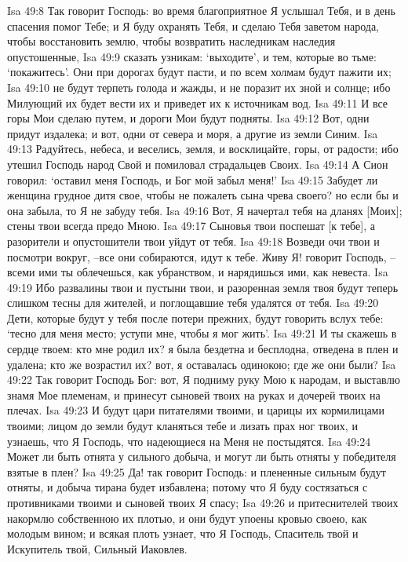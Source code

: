 Isa 49:8  Так говорит Господь: во время благоприятное Я услышал Тебя, и в день спасения помог Тебе; и Я буду охранять Тебя, и сделаю Тебя заветом народа, чтобы восстановить землю, чтобы возвратить наследникам наследия опустошенные,
Isa 49:9  сказать узникам: `выходите', и тем, которые во тьме: `покажитесь'. Они при дорогах будут пасти, и по всем холмам будут пажити их;
Isa 49:10  не будут терпеть голода и жажды, и не поразит их зной и солнце; ибо Милующий их будет вести их и приведет их к источникам вод.
Isa 49:11  И все горы Мои сделаю путем, и дороги Мои будут подняты.
Isa 49:12  Вот, одни придут издалека; и вот, одни от севера и моря, а другие из земли Синим.
Isa 49:13  Радуйтесь, небеса, и веселись, земля, и восклицайте, горы, от радости; ибо утешил Господь народ Свой и помиловал страдальцев Своих.
Isa 49:14  А Сион говорил: `оставил меня Господь, и Бог мой забыл меня!'
Isa 49:15  Забудет ли женщина грудное дитя свое, чтобы не пожалеть сына чрева своего? но если бы и она забыла, то Я не забуду тебя.
Isa 49:16  Вот, Я начертал тебя на дланях [Моих]; стены твои всегда предо Мною.
Isa 49:17  Сыновья твои поспешат [к тебе], а разорители и опустошители твои уйдут от тебя.
Isa 49:18  Возведи очи твои и посмотри вокруг, --все они собираются, идут к тебе. Живу Я! говорит Господь, --всеми ими ты облечешься, как убранством, и нарядишься ими, как невеста.
Isa 49:19  Ибо развалины твои и пустыни твои, и разоренная земля твоя будут теперь слишком тесны для жителей, и поглощавшие тебя удалятся от тебя.
Isa 49:20  Дети, которые будут у тебя после потери прежних, будут говорить вслух тебе: `тесно для меня место; уступи мне, чтобы я мог жить'.
Isa 49:21  И ты скажешь в сердце твоем: кто мне родил их? я была бездетна и бесплодна, отведена в плен и удалена; кто же возрастил их? вот, я оставалась одинокою; где же они были?
Isa 49:22  Так говорит Господь Бог: вот, Я подниму руку Мою к народам, и выставлю знамя Мое племенам, и принесут сыновей твоих на руках и дочерей твоих на плечах.
Isa 49:23  И будут цари питателями твоими, и царицы их кормилицами твоими; лицом до земли будут кланяться тебе и лизать прах ног твоих, и узнаешь, что Я Господь, что надеющиеся на Меня не постыдятся.
Isa 49:24  Может ли быть отнята у сильного добыча, и могут ли быть отняты у победителя взятые в плен?
Isa 49:25  Да! так говорит Господь: и плененные сильным будут отняты, и добыча тирана будет избавлена; потому что Я буду состязаться с противниками твоими и сыновей твоих Я спасу;
Isa 49:26  и притеснителей твоих накормлю собственною их плотью, и они будут упоены кровью своею, как молодым вином; и всякая плоть узнает, что Я Господь, Спаситель твой и Искупитель твой, Сильный Иаковлев.
